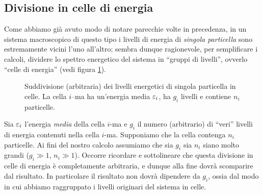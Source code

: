 \subsection{Divisione in celle di energia}
Come abbiamo già avuto modo di notare parecchie volte in precedenza, in un sistema macroscopico di questo tipo i livelli di energia di {\em singola particella} sono estremamente vicini l'uno all'altro; sembra dunque ragionevole, per semplificare i calcoli, dividere lo spettro energetico del sistema in ``gruppi di livelli'', ovverlo ``celle di energia'' (vedi figura \ref{fig:cellen}).
\begin{figure}[h!t]
\label{fig:cellen}
\centering
{}
\caption{Suddivisione (arbitraria) dei livelli energetici di singola particella in celle. La cella $i$--ma ha un'energia media $\varepsilon_i$, ha $g_i$ livelli e contiene $n_i$ particelle.}
\end{figure}
Sia $\varepsilon_{i}$ l'energia {\em media} della cella $i$-ma e $g_{i}$ il numero (arbitrario) di ``veri'' livelli di energia contenuti nella cella $i$-ma. Supponiamo che la cella contenga $n_{i}$ particelle. Ai fini del nostro calcolo assumiamo che sia $g_{i}$ sia $n_{i}$ siano molto grandi ($g_{i}\gg 1$, $n_{i}\gg 1$). Occorre ricordare e sottolineare che questa divisione in celle di energia è completamente arbitraria, e dunque alla fine dovrà scomparire dal risultato. In particolare il risultato non dovrà dipendere da $g_{i}$, ossia dal modo in cui abbiamo raggruppato i livelli originari del sistema in celle.

